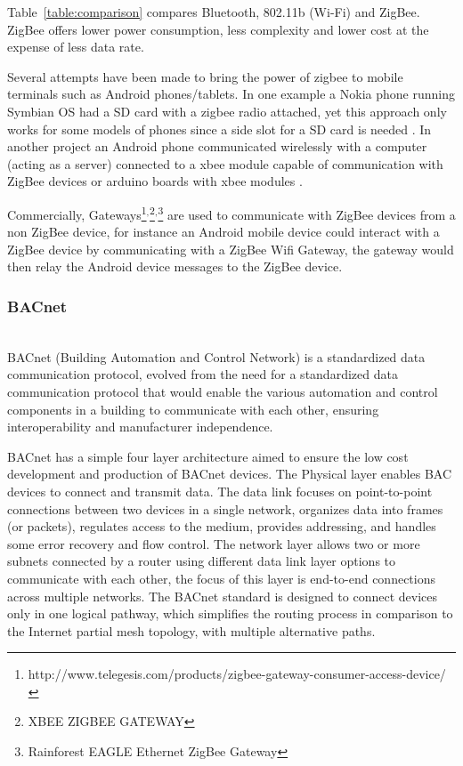  Table~\ref{table:comparison} compares Bluetooth, 802.11b (Wi-Fi) and ZigBee. ZigBee \cite{article:zigbee_survey} offers lower power consumption, less complexity and lower cost at the expense of less data rate.

Several attempts have been made to bring the power of zigbee to mobile terminals such as Android phones/tablets. In one example a Nokia phone running Symbian OS had a SD card with a zigbee radio attached, yet this approach only works for some models of phones since a side slot for a SD card is needed \cite{Sensing_Platform}.
In another project an Android phone communicated wirelessly with a computer (acting as a server) connected to a xbee module capable of communication with ZigBee devices or arduino boards with xbee modules \cite{article:zigbee_android}.

Commercially, Gateways\footnote{http://www.telegesis.com/products/zigbee-gateway-consumer-access-device/}$^{,}$\footnote{XBEE ZIGBEE GATEWAY}$^{,}$\footnote{Rainforest EAGLE Ethernet ZigBee Gateway} are used to communicate with ZigBee devices from a non ZigBee device, for instance an Android mobile device could interact with a ZigBee device by communicating with a ZigBee Wifi Gateway, the gateway would then relay the Android device messages to the ZigBee device.


\subsubsection{BACnet}\mbox{}\\


BACnet (Building Automation and Control Network) \cite{livro_automation,bacnet:artigo1,bacnet:bib,livro_automation2} is a standardized data communication protocol, evolved from the need for a standardized data communication protocol that would enable the various automation and control components in a building to communicate with each other, ensuring interoperability and manufacturer independence.

BACnet has a simple four layer architecture aimed to ensure the low cost development and production of BACnet devices. The Physical layer enables BAC devices to connect and transmit data. The data link focuses on point-to-point connections between two devices in a single network, organizes data into frames (or packets), regulates access to the medium, provides addressing, and handles some error recovery and flow control.
The network layer allows two or more subnets connected by a router using different data link layer options to communicate with each other, the focus of this layer is end-to-end connections across multiple networks. The BACnet standard is designed to connect devices only in one logical pathway, which simplifies the routing process in comparison to the Internet partial mesh topology, with multiple alternative paths.

